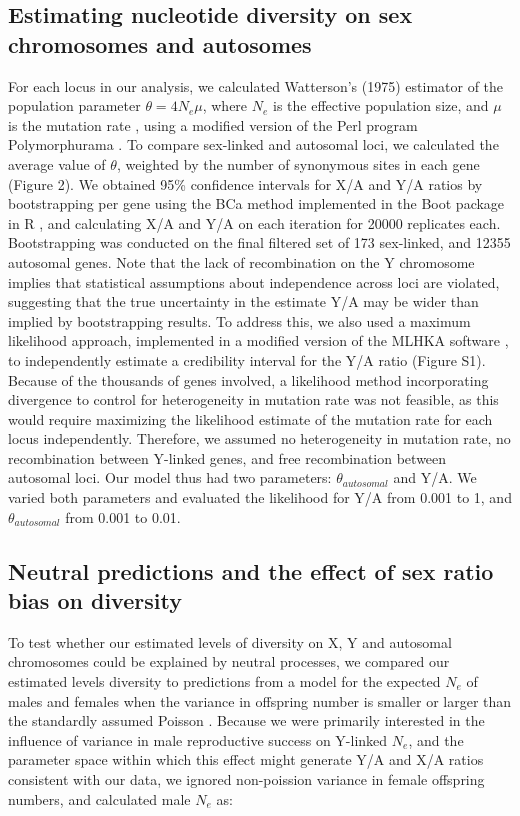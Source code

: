 \documentclass[9pt,twocolumn,twoside]{gsajnl}
\begin{document}
\subsection*{Estimating nucleotide diversity on sex chromosomes and autosomes}
For each locus in our analysis, we calculated Watterson's (1975) estimator of the population parameter $\theta=4N_{e}\mu$, where $N_{e}$ is the effective population size, and $\mu$ is the mutation rate \citep{watterson1975}, using a modified version of the Perl program Polymorphurama \citep{bachtrog2006}. To compare sex-linked and autosomal loci, we calculated the average value of $\theta$, weighted by the number of synonymous sites in each gene (\X Figure 2). We obtained 95\% confidence intervals for X/A and Y/A ratios by bootstrapping per gene using the BCa method \citep{efron1994} implemented in the Boot package in R \citep{canty2012boot}, and calculating X/A and Y/A on each iteration for 20000 replicates each. Bootstrapping was conducted on the final filtered set of 173 sex-linked, and 12355 autosomal genes. Note that the lack of recombination on the Y chromosome implies that statistical assumptions about independence across loci are violated, suggesting that the true uncertainty in the estimate Y/A may be wider than implied by bootstrapping results. To address this, we also used a maximum likelihood approach, implemented in a modified version of the MLHKA software \citep{wright2004hka}, to independently estimate a credibility interval for the Y/A ratio (Figure S1). Because of the thousands of genes involved, a likelihood method incorporating divergence to control for heterogeneity in mutation rate was not feasible, as this would require maximizing the likelihood estimate of the mutation rate for each locus independently. Therefore, we assumed no heterogeneity in mutation rate, no recombination between Y-linked genes, and free recombination between autosomal loci. Our model thus had two parameters: $\theta_{autosomal}$ and Y/A. We varied both parameters and evaluated the likelihood for Y/A from 0.001 to 1, and $\theta_{autosomal}$ from 0.001 to 0.01.

\subsection*{Neutral predictions and the effect of sex ratio bias on diversity}
To test whether our estimated levels of diversity on X, Y and autosomal chromosomes could be explained by neutral processes, we compared our estimated levels diversity to predictions from a model for the expected $N_{e}$ of males and females when the variance in offspring number is smaller or larger than the standardly assumed Poisson \citep{kimura1964number, hedrick2011genetics}. Because we were primarily interested in the influence of variance in male reproductive success on Y-linked $N_{e}$, and the parameter space within which this effect might generate Y/A and X/A ratios consistent with our data, we ignored non-poission variance in female offspring numbers, and calculated male $N_{e}$ as:
\end{document}
